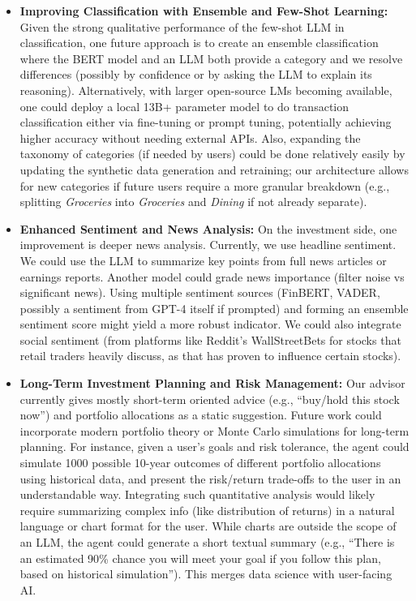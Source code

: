 \documentclass{scrartcl}
\begin{document}
\begin{itemize}
    \item \textbf{Improving Classification with Ensemble and Few-Shot Learning:} Given the strong qualitative performance of the few-shot LLM in classification, one future approach is to create an ensemble classification where the BERT model and an LLM both provide a category and we resolve differences (possibly by confidence or by asking the LLM to explain its reasoning). Alternatively, with larger open-source LMs becoming available, one could deploy a local 13B+ parameter model to do transaction classification either via fine-tuning or prompt tuning, potentially achieving higher accuracy without needing external APIs. Also, expanding the taxonomy of categories (if needed by users) could be done relatively easily by updating the synthetic data generation and retraining; our architecture allows for new categories if future users require a more granular breakdown (e.g., splitting \textit{Groceries} into \textit{Groceries} and \textit{Dining} if not already separate).
    \item \textbf{Enhanced Sentiment and News Analysis:} On the investment side, one improvement is deeper news analysis. Currently, we use headline sentiment. We could use the LLM to summarize key points from full news articles or earnings reports. Another model could grade news importance (filter noise vs significant news). Using multiple sentiment sources (FinBERT, VADER, possibly a sentiment from GPT-4 itself if prompted) and forming an ensemble sentiment score might yield a more robust indicator. We could also integrate social sentiment (from platforms like Reddit’s WallStreetBets for stocks that retail traders heavily discuss, as that has proven to influence certain stocks).
    \item \textbf{Long-Term Investment Planning and Risk Management:} Our advisor currently gives mostly short-term oriented advice (e.g., “buy/hold this stock now”) and portfolio allocations as a static suggestion. Future work could incorporate modern portfolio theory or Monte Carlo simulations for long-term planning. For instance, given a user’s goals and risk tolerance, the agent could simulate 1000 possible 10-year outcomes of different portfolio allocations using historical data, and present the risk/return trade-offs to the user in an understandable way. Integrating such quantitative analysis would likely require summarizing complex info (like distribution of returns) in a natural language or chart format for the user. While charts are outside the scope of an LLM, the agent could generate a short textual summary (e.g., “There is an estimated 90\% chance you will meet your goal if you follow this plan, based on historical simulation”). This merges data science with user-facing AI.

\end{itemize}
\end{document}
